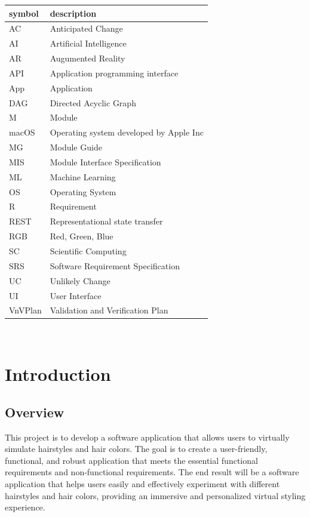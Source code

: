 \documentclass[12pt, titlepage]{article}
\begin{document}
\renewcommand{\arraystretch}{1.2}
\begin{tabular}{l l} 
  \toprule		
  \textbf{symbol} & \textbf{description}\\
  \midrule 
  AC & Anticipated Change\\
  AI & Artificial Intelligence \\
  AR & Augumented Reality \\
  API & Application programming interface\\
  App & Application \\
  DAG & Directed Acyclic Graph \\
  M & Module \\
  macOS & Operating system developed by Apple Inc \\
  MG & Module Guide \\
  MIS & Module Interface Specification \\
  ML & Machine Learning \\
  OS & Operating System \\
  R & Requirement\\
  REST & Representational state transfer\\
  RGB & Red, Green, Blue \\
  SC & Scientific Computing \\
  SRS & Software Requirement Specification \\
  UC & Unlikely Change \\
  UI & User Interface\\



  VnVPlan & Validation and Verification Plan \\

  \bottomrule
\end{tabular}\\

\newpage

\tableofcontents

\listoftables

\listoffigures

\newpage


\section{Introduction}

	\subsection{Overview}
	This project is to develop a software application that allows users to virtually simulate hairstyles and hair colors. The goal is to create a user-friendly, functional, and robust application that meets the essential functional requirements and non-functional requirements. The end result will be a software application that helps users easily and effectively experiment with different hairstyles and hair colors, providing an immersive and personalized virtual styling experience.
	
\end{document}
